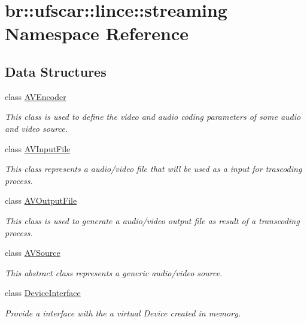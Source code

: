 \hypertarget{namespacebr_1_1ufscar_1_1lince_1_1streaming}{
\section{br::ufscar::lince::streaming Namespace Reference}
\label{namespacebr_1_1ufscar_1_1lince_1_1streaming}
}
\subsection*{Data Structures}
\begin{DoxyCompactItemize}
\item 
class \hyperlink{classbr_1_1ufscar_1_1lince_1_1streaming_1_1AVEncoder}{AVEncoder}
\begin{DoxyCompactList}\small\item\em This class is used to define the video and audio coding parameters of some audio and video source. \item\end{DoxyCompactList}\item 
class \hyperlink{classbr_1_1ufscar_1_1lince_1_1streaming_1_1AVInputFile}{AVInputFile}
\begin{DoxyCompactList}\small\item\em This class represents a audio/video file that will be used as a input for trascoding process. \item\end{DoxyCompactList}\item 
class \hyperlink{classbr_1_1ufscar_1_1lince_1_1streaming_1_1AVOutputFile}{AVOutputFile}
\begin{DoxyCompactList}\small\item\em This class is used to generate a audio/video output file as result of a transcoding process. \item\end{DoxyCompactList}\item 
class \hyperlink{classbr_1_1ufscar_1_1lince_1_1streaming_1_1AVSource}{AVSource}
\begin{DoxyCompactList}\small\item\em This abstract class represents a generic audio/video source. \item\end{DoxyCompactList}\item 
class \hyperlink{classbr_1_1ufscar_1_1lince_1_1streaming_1_1DeviceInterface}{DeviceInterface}
\begin{DoxyCompactList}\small\item\em Provide a interface with the a virtual Device created in memory. \item\end{DoxyCompactList}\item 

\end{DoxyCompactItemize}
